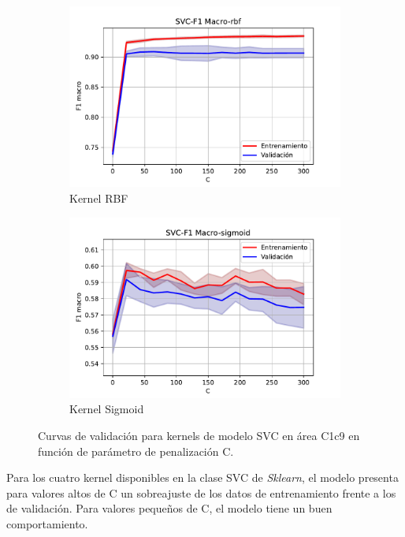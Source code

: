 \begin{figure}[H]
\begin{subfigure}[b]{.45\linewidth}
		\includegraphics[width=\linewidth]{imagenes/resultados/svm/curvas_validacion/SVC-F1 Macro-rbf.pdf}
		\caption{Kernel RBF}
		\label{res:svc_vc_rbf}
	\end{subfigure}
	\begin{subfigure}[b]{.45\linewidth}
		\includegraphics[width=\linewidth]{imagenes/resultados/svm/curvas_validacion/SVC-F1 Macro-sigmoid.pdf}
		\caption{Kernel Sigmoid}
		\label{res:svc_vc_sigmoid}
	\end{subfigure}
	\caption{Curvas de validación para kernels de modelo SVC en área C1c9 en función de parámetro de penalización C.}
	\label{res:svc_vc}
\end{figure}

Para los cuatro kernel disponibles en la clase SVC de \textit{Sklearn}, el modelo presenta para valores altos de C un sobreajuste de los datos de entrenamiento frente a los de validación. Para valores pequeños de C, el modelo tiene un buen comportamiento.

